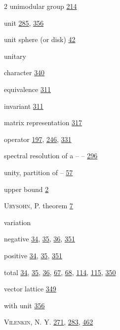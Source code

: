 \begin{multicols}{2}
\noindent unimodular group \hyperlink{page.214}{214}\par
\noindent unit \hyperlink{page.285}{285}, \hyperlink{page.356}{356}\par
\noindent unit sphere (or disk) \hyperlink{page.42}{42}\par
\noindent unitary\par
\hspace*{1.1em}character \hyperlink{page.340}{340}\par
\hspace*{1.1em}equivalence \hyperlink{page.311}{311}\par
\hspace*{1.1em}invariant \hyperlink{page.311}{311}\par
\hspace*{1.1em}matrix representation \hyperlink{page.317}{317}\par
\hspace*{1.1em}operator \hyperlink{page.197}{197}, \hyperlink{page.246}{246}, \hyperlink{page.331}{331}\par
\hspace*{2.2em}spectral resolution of a -- -- \hyperlink{page.296}{296}\par
\noindent unity, partition of -- \hyperlink{page.57}{57}\par
\noindent upper bound \hyperlink{page.2}{2}\par
\noindent \textsc{Urysohn}, P. theorem \hyperlink{page.7}{7}\par
\noindent variation\par
\hspace*{1.1em}negative \hyperlink{page.34}{34}, \hyperlink{page.35}{35}, \hyperlink{page.36}{36}, \hyperlink{page.351}{351}\par
\hspace*{1.1em}positive \hyperlink{page.34}{34}, \hyperlink{page.35}{35}, \hyperlink{page.351}{351}\par
\hspace*{1.1em}total \hyperlink{page.34}{34}, \hyperlink{page.35}{35}, \hyperlink{page.36}{36}, \hyperlink{page.67}{67}, \hyperlink{page.68}{68}, \hyperlink{page.114}{114}, \hyperlink{page.115}{115}, \hyperlink{page.350}{350}\par
\noindent vector lattice \hyperlink{page.349}{349}\par
\hspace*{1.1em}with unit \hyperlink{page.356}{356}\par
\noindent \textsc{Vilenkin}, N. Y. \hyperlink{page.271}{271}, \hyperlink{page.283}{283}, \hyperlink{page.462}{462}\par

\end{multicols}
